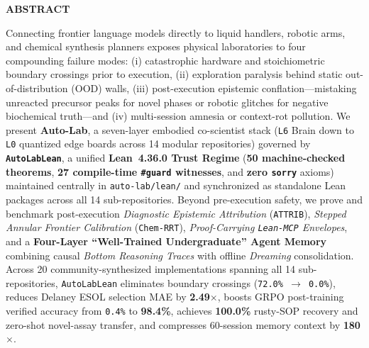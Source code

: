 \documentclass[10pt,letterpaper]{article}
\begin{document}
\begin{tcolorbox}[
  enhanced,
  colback=softbg,
  colframe=linegray,
  borderline west={3pt}{0pt}{tealaccent},
  arc=3.5pt,
  boxrule=0.55pt,
  left=10pt, right=10pt, top=6pt, bottom=6pt
]
{\footnotesize\sffamily\bfseries\textcolor{tealdeep}{ABSTRACT}}\par\vspace{2pt}
{\footnotesize\color{ink}%
Connecting frontier language models directly to liquid handlers, robotic arms, and chemical synthesis planners exposes physical laboratories to four compounding failure modes: (i) catastrophic hardware and stoichiometric boundary crossings prior to execution, (ii) exploration paralysis behind static out-of-distribution (OOD) walls, (iii) post-execution epistemic conflation—mistaking unreacted precursor peaks for novel phases or robotic glitches for negative biochemical truth—and (iv) multi-session amnesia or context-rot pollution. We present \textbf{Auto-Lab}, a seven-layer embodied co-scientist stack (\texttt{L6} Brain down to \texttt{L0} quantized edge boards across 14 modular repositories) governed by \textbf{\texttt{AutoLabLean}}, a unified \textbf{Lean~4.36.0 Trust Regime} (\textbf{50 machine-checked theorems}, \textbf{27 compile-time \texttt{\#guard} witnesses}, and \textbf{zero \texttt{sorry}} axioms) maintained centrally in \texttt{auto-lab/lean/} and synchronized as standalone Lean packages across all 14 sub-repositories. Beyond pre-execution safety, we prove and benchmark post-execution \emph{Diagnostic Epistemic Attribution} (\texttt{ATTRIB}), \emph{Stepped Annular Frontier Calibration} (\texttt{Chem-RRT}), \emph{Proof-Carrying \texttt{Lean-MCP} Envelopes}, and a \textbf{Four-Layer ``Well-Trained Undergraduate'' Agent Memory} combining causal \emph{Bottom Reasoning Traces} with offline \emph{Dreaming} consolidation. Across 20 community-synthesized implementations spanning all 14 sub-repositories, \texttt{AutoLabLean} eliminates boundary crossings (\texttt{72.0\% $\to$ 0.0\%}), reduces Delaney ESOL selection MAE by \textbf{2.49$\times$}, boosts GRPO post-training verified accuracy from \texttt{0.4\%} to \textbf{98.4\%}, achieves \textbf{100.0\%} rusty-SOP recovery and zero-shot novel-assay transfer, and compresses 60-session memory context by \textbf{180$\times$}.}


\end{tcolorbox}
\end{document}
